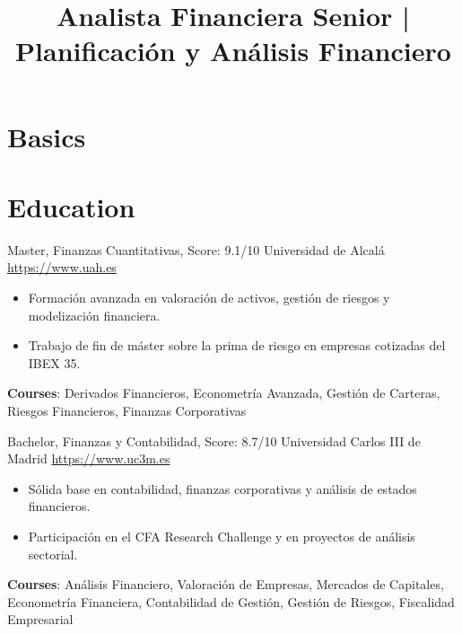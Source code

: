 \documentclass[a4paper, serif, 10pt]{moderncv}
\title{Analista Financiera Senior | Planificación y Análisis Financiero}
\begin{document}
\maketitle

\section{Basics}

\section{Education}

        {Master, Finanzas Cuantitativas, Score: 9.1/10}
        {Universidad de Alcalá}
        {\url{https://www.uah.es}}
        {}
        {\begin{itemize}
\item Formación avanzada en valoración de activos, gestión de riesgos y modelización financiera.
\item Trabajo de fin de máster sobre la prima de riesgo en empresas cotizadas del IBEX 35.
\end{itemize}
\textbf{Courses}: Derivados Financieros, Econometría Avanzada, Gestión de Carteras, Riesgos Financieros, Finanzas Corporativas}

        {Bachelor, Finanzas y Contabilidad, Score: 8.7/10}
        {Universidad Carlos III de Madrid}
        {\url{https://www.uc3m.es}}
        {}
        {\begin{itemize}
\item Sólida base en contabilidad, finanzas corporativas y análisis de estados financieros.
\item Participación en el CFA Research Challenge y en proyectos de análisis sectorial.
\end{itemize}
\textbf{Courses}: Análisis Financiero, Valoración de Empresas, Mercados de Capitales, Econometría Financiera, Contabilidad de Gestión, Gestión de Riesgos, Fiscalidad Empresarial}
\end{document}
